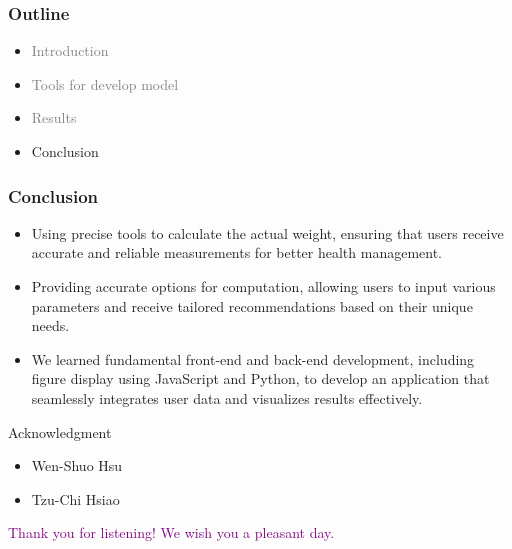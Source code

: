 \documentclass[fleqn]{beamer}
\begin{document}
\begin{frame}
\frametitle{Outline}
\begin{itemize}
\item \textcolor{gray}{Introduction} \\
\item \textcolor{gray}{Tools for develop model} \\
\item \textcolor{gray}{Results} \\
\item Conclusion
\end{itemize}
\end{frame}
\begin{frame}
\frametitle{Conclusion}
\begin{itemize}
\item Using precise tools to calculate the actual weight, ensuring that users receive accurate and reliable measurements for better health management. \\
\pause
\item Providing accurate options for computation, allowing users to input various parameters and receive tailored recommendations based on their unique needs. \\
\pause
\item We learned fundamental front-end and back-end development, including figure display using JavaScript and Python, to develop an application that seamlessly integrates user data and visualizes results effectively.
\end{itemize}
\end{frame}
\begin{frame}{Acknowledgment}
\begin{block}{}
\normalsize
{}
\begin{itemize}
\item Wen-Shuo Hsu
\item Tzu-Chi Hsiao
\end{itemize}
\end{block}
\vspace{1em}
\begin{block}{}
\normalsize
{}
\begin{center}
\textcolor{purple}{Thank you for listening! We wish you a pleasant day.}
\end{center}
\end{block}
\end{frame}
\end{document}
